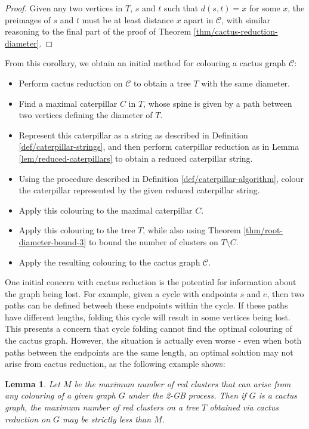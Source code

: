 \documentclass{mpaper}
\newtheorem{lemma}[theorem]{Lemma}
\begin{document}
\begin{proof}
Given any two vertices in $T$, $s$ and $t$ such that $d(s,t)=x$ for some $x$, the preimages of $s$ and $t$ must be at least distance $x$ apart in $\mathcal{C}$, with similar reasoning to the final part of the proof of Theorem \ref{thm/cactus-reduction-diameter}.
\end{proof}

From this corollary, we obtain an initial method for colouring a cactus graph $\mathcal{C}$:

\begin{itemize}
  \item Perform cactus reduction on $\mathcal{C}$ to obtain a tree $T$ with the same diameter.
  \item Find a maximal caterpillar $C$ in $T$, whose spine is given by a path between two vertices defining the diameter of $T$.
  \item Represent this caterpillar as a string as described in Definition \ref{def/caterpillar-strings}, and then perform caterpillar reduction as in Lemma \ref{lem/reduced-caterpillars} to obtain a reduced caterpillar string.
  \item Using the procedure described in Definition \ref{def/caterpillar-algorithm}, colour the caterpillar represented by the given reduced caterpillar string.
  \item Apply this colouring to the maximal caterpillar $C$.
  \item Apply this colouring to the tree $T$, while also using Theorem \ref{thm/root-diameter-bound-3} to bound the number of clusters on $T \setminus C$.
  \item Apply the resulting colouring to the cactus graph $\mathcal{C}$.
\end{itemize}

One initial concern with cactus reduction is the potential for information about the graph being lost. For example, given a cycle with endpoints $s$ and $e$, then two paths can be defined betweeh these endpoints within the cycle. If these paths have different lengths, folding this cycle will result in some vertices being lost. This presents a concern that cycle folding cannot find the optimal colouring of the cactus graph. However, the situation is actually even worse - even when both paths between the endpoints are the same length, an optimal solution may not arise from cactus reduction, as the following example shows:

\begin{lemma}
  Let $M$ be the maximum number of red clusters that can arise from any colouring of a given graph $G$ under the 2-GB process. Then if $G$ is a cactus graph, the maximum number of red clusters on a tree $T$ obtained via cactus reduction on $G$ may be strictly less than $M$.
\end{lemma}
\end{document}
